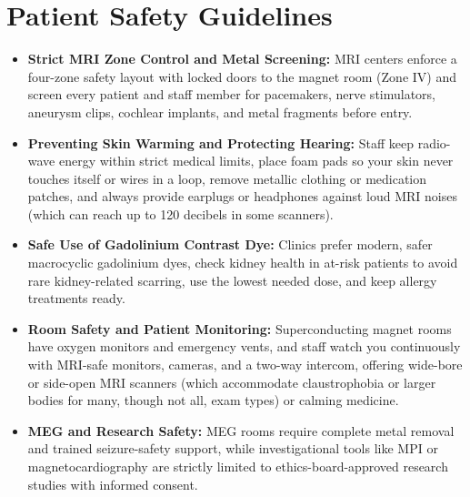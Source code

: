 \section{Patient Safety Guidelines}
\begin{itemize}
  \item \textbf{Strict MRI Zone Control and Metal Screening:} MRI centers enforce a four-zone safety layout with locked doors to the magnet room (Zone IV) and screen every patient and staff member for pacemakers, nerve stimulators, aneurysm clips, cochlear implants, and metal fragments before entry.
  \item \textbf{Preventing Skin Warming and Protecting Hearing:} Staff keep radio-wave energy within strict medical limits, place foam pads so your skin never touches itself or wires in a loop, remove metallic clothing or medication patches, and always provide earplugs or headphones against loud MRI noises (which can reach up to 120 decibels in some scanners).
  \item \textbf{Safe Use of Gadolinium Contrast Dye:} Clinics prefer modern, safer macrocyclic gadolinium dyes, check kidney health in at-risk patients to avoid rare kidney-related scarring, use the lowest needed dose, and keep allergy treatments ready.
  \item \textbf{Room Safety and Patient Monitoring:} Superconducting magnet rooms have oxygen monitors and emergency vents, and staff watch you continuously with MRI-safe monitors, cameras, and a two-way intercom, offering wide-bore or side-open MRI scanners (which accommodate claustrophobia or larger bodies for many, though not all, exam types) or calming medicine.
  \item \textbf{MEG and Research Safety:} MEG rooms require complete metal removal and trained seizure-safety support, while investigational tools like MPI or magnetocardiography are strictly limited to ethics-board-approved research studies with informed consent.
\end{itemize}

